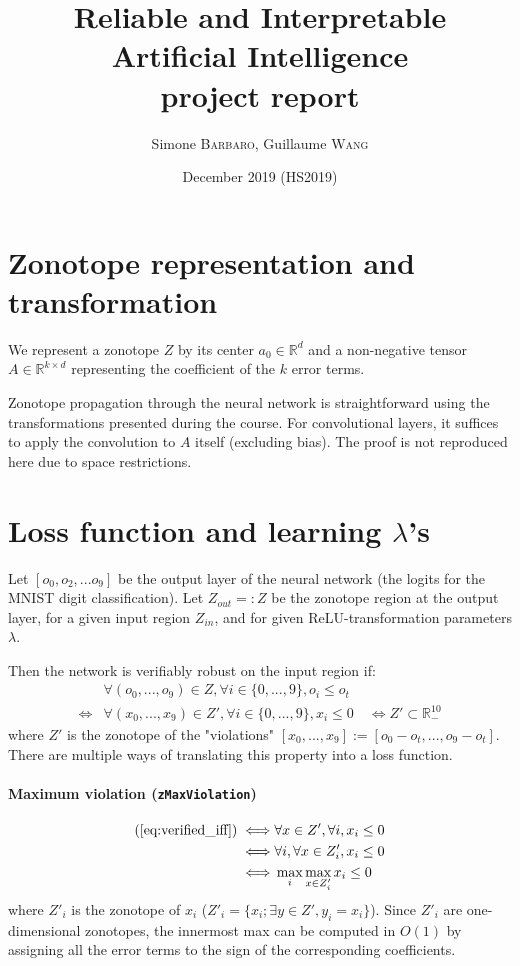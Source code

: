 \documentclass{article}
\title{Reliable and Interpretable Artificial Intelligence \\ project report}
\author{Simone \textsc{Barbaro}, Guillaume \textsc{Wang}}
\date{\small{ December 2019 (HS2019)}}
\newcommand{\RR}{\mathbb{R}}
\begin{document}
\maketitle

\section{Zonotope representation and transformation}

We represent a zonotope $Z$ by its center $a_0 \in \RR^d$ and a non-negative tensor $A \in \RR^{k \times d}$ representing the coefficient of the $k$ error terms.

Zonotope propagation through the neural network is straightforward using the transformations presented during the course.
For convolutional layers, it suffices to apply the convolution to $A$ itself (excluding bias).
The proof is not reproduced here due to space restrictions.

\section{Loss function and learning \texorpdfstring{$\lambda$'s}{lambdas}}

Let $[o_0, o_2, ... o_9]$ be the output layer of the neural network (the logits for the MNIST digit classification). 
Let $Z_{out} =: Z$ be the zonotope region at the output layer, for a given input region $Z_{in}$, and for given ReLU-transformation parameters $\lambda$.

Then the network is verifiably robust on the input region if:
\begin{align}
    &\forall (o_0, ..., o_9) \in Z, \forall i \in \{0, ..., 9\}, o_i \leq o_t \nonumber \\
    \iff & \forall (x_0, ..., x_9) \in Z', \forall i \in \{0, ..., 9\}, x_i \leq 0 \nonumber \quad
    \iff Z' \subset \RR_{-}^{10} \label{eq:verified_iff} \tag{*}
\end{align}
where $Z'$ is the zonotope of the "violations" $[x_0, ..., x_9] := [o_0 - o_t, ..., o_9 - o_t]$.
There are multiple ways of translating this property into a loss function.

\paragraph{Maximum violation (\texttt{zMaxViolation})}
\begin{align*}
    ( \ref{eq:verified_iff} )
    \iff & \forall x \in Z', \forall i, x_i \leq 0 \\
    \iff & \forall i, \forall x \in Z'_i, x_i \leq 0 \\
    \iff & \max_i \max_{x \in Z'_i} x_i \leq 0
\end{align*}
where $Z'_i$ is the zonotope of $x_i$ ($Z'_i = \{ x_i; \exists y \in Z', y_i = x_i \}$).
Since $Z'_i$ are one-dimensional zonotopes, the innermost max can be computed in $O(1)$ by assigning all the error terms to the sign of the corresponding coefficients.
\end{document}
